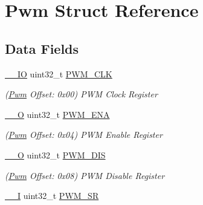 \hypertarget{structPwm}{}\section{Pwm Struct Reference}
\label{structPwm}
\subsection*{Data Fields}
\begin{DoxyCompactItemize}
\item 
\mbox{\label{structPwm_af44b7c080ed575114213168f370af1fe}} 
\mbox{\hyperlink{core__cm7_8h_aec43007d9998a0a0e01faede4133d6be}{\+\_\+\+\_\+\+IO}} uint32\+\_\+t \mbox{\hyperlink{structPwm_af44b7c080ed575114213168f370af1fe}{P\+W\+M\+\_\+\+C\+LK}}
\begin{DoxyCompactList}\small\item\em (\mbox{\hyperlink{structPwm}{Pwm}} Offset\+: 0x00) P\+WM Clock Register \end{DoxyCompactList}\item 
\mbox{\label{structPwm_af98a5a75cda31546c3f10d98e40b1df2}} 
\mbox{\hyperlink{core__cm7_8h_a7e25d9380f9ef903923964322e71f2f6}{\+\_\+\+\_\+O}} uint32\+\_\+t \mbox{\hyperlink{structPwm_af98a5a75cda31546c3f10d98e40b1df2}{P\+W\+M\+\_\+\+E\+NA}}
\begin{DoxyCompactList}\small\item\em (\mbox{\hyperlink{structPwm}{Pwm}} Offset\+: 0x04) P\+WM Enable Register \end{DoxyCompactList}\item 
\mbox{\label{structPwm_aa5fa0570cb3649d0b6e68e13ea72858a}} 
\mbox{\hyperlink{core__cm7_8h_a7e25d9380f9ef903923964322e71f2f6}{\+\_\+\+\_\+O}} uint32\+\_\+t \mbox{\hyperlink{structPwm_aa5fa0570cb3649d0b6e68e13ea72858a}{P\+W\+M\+\_\+\+D\+IS}}
\begin{DoxyCompactList}\small\item\em (\mbox{\hyperlink{structPwm}{Pwm}} Offset\+: 0x08) P\+WM Disable Register \end{DoxyCompactList}\item 
\mbox{\label{structPwm_a698461997ab5f9b9b0a768cd6f35727a}} 
\mbox{\hyperlink{core__cm7_8h_af63697ed9952cc71e1225efe205f6cd3}{\+\_\+\+\_\+I}} uint32\+\_\+t \mbox{\hyperlink{structPwm_a698461997ab5f9b9b0a768cd6f35727a}{P\+W\+M\+\_\+\+SR}}

\end{DoxyCompactItemize}
